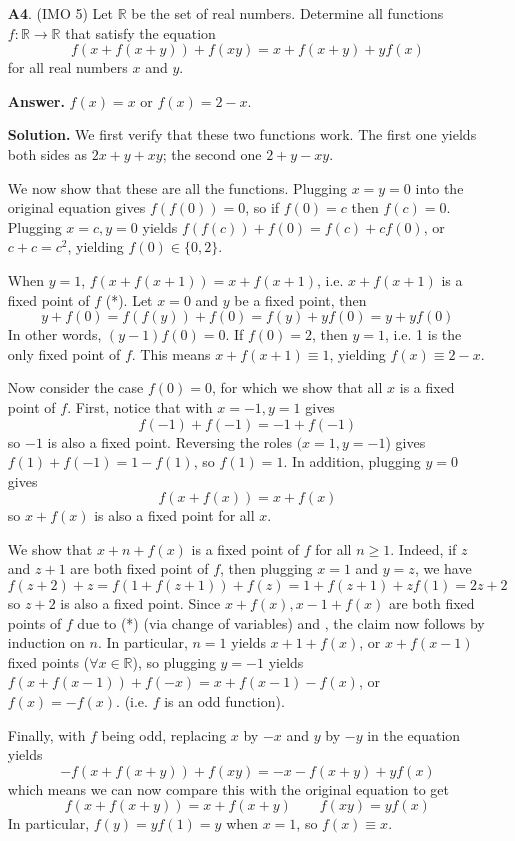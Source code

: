 \documentclass[11pt,a4paper]{article}
\begin{document}
\begin{enumerate}
\item[\textbf{A4}.] (IMO 5) Let $\mathbb R$ be the set of real numbers. Determine all functions $f:\mathbb R\to\mathbb R$ that satisfy the equation\[f(x+f(x+y))+f(xy)=x+f(x+y)+yf(x)\]for all real numbers $x$ and $y$.

\textbf{Answer.} $f(x)=x$ or $f(x)=2-x$. 

\textbf{Solution.} 
We first verify that these two functions work. The first one yields both sides as $2x + y + xy$; 
the second one $2 + y - xy$. 

We now show that these are all the functions. 
Plugging $x=y=0$ into the original equation gives $f(f(0))=0$, so if $f(0)=c$ then $f(c)=0$. Plugging $x=c, y=0$ yields $f(f(c))+f(0)=f(c)+cf(0)$, or $c+c=c^2$, yielding $f(0)\in \{0,2\}$. 

When $y=1$, $f(x+f(x+1))=x+f(x+1)$, i.e. $x + f(x + 1)$ is a fixed point of $f$ (*). 
Let $x=0$ and $y$ be a fixed point, then 
\begin{equation}
	y+f(0)=f(f(y))+f(0)=f(y)+yf(0)=y+yf(0)
\end{equation}
In other words, $(y-1)f(0)=0$. 
If $f(0)=2$, then $y=1$, i.e. 1 is the only fixed point of $f$. This means $x+f(x+1)\equiv 1$, yielding $f(x)\equiv 2-x$.

Now consider the case $f(0)=0$, for which we show that all $x$ is a fixed point of $f$.
First, notice that with $x=-1, y=1$ gives 
\[
f(-1) + f(-1) = -1+ f(-1)
\]
so $-1$ is also a fixed point. Reversing the roles $(x=1, y=-1$) gives 
$f(1) + f(-1) = 1 - f(1)$, so $f(1) = 1$. 
In addition, plugging $y=0$ gives 
\begin{equation}\label{eq:a4eq1}
	f(x + f(x)) = x + f(x)
\end{equation}
so $x + f(x)$ is also a fixed point for all $x$. 

We show that $x+n+f(x)$ is a fixed point of $f$ for all $n\ge 1$. 
Indeed, if $z$ and $z+1$ are both fixed point of $f$, then plugging $x=1$ and $y=z$, we have 
\[
f(z + 2) + z = f(1 + f(z + 1)) + f(z) = 1 + f(z + 1) + zf(1) = 2z + 2
\]
so $z + 2$ is also a fixed point. 
Since $x + f(x), x - 1 + f(x)$ are both fixed points of $f$ due to (*) (via change of variables) and , the claim now follows by induction on $n$. 
In particular, $n=1$ yields $x+1+f(x)$, or $x+f(x-1)$ fixed points ($\forall x\in\mathbb{R}$), so plugging $y=-1$ yields $f(x+f(x-1))+f(-x)=x+f(x-1)-f(x)$, or $f(x)=-f(x)$. (i.e. $f$ is an odd function). 

Finally, with $f$ being odd, replacing $x$ by $-x$ and $y$ by $-y$ in the equation yields 
\[
-f(x + f(x + y)) + f(xy) = -x - f(x + y) + yf(x)
\]
which means we can now compare this with the original equation to get 
\begin{equation}
	f(x + f(x + y)) = x + f(x + y)
	\qquad 
	f(xy) = yf(x)
\end{equation}
In particular, $f(y)=yf(1)=y$ when $x=1$, so $f(x)\equiv x$. 

\end{enumerate}
\end{document}
